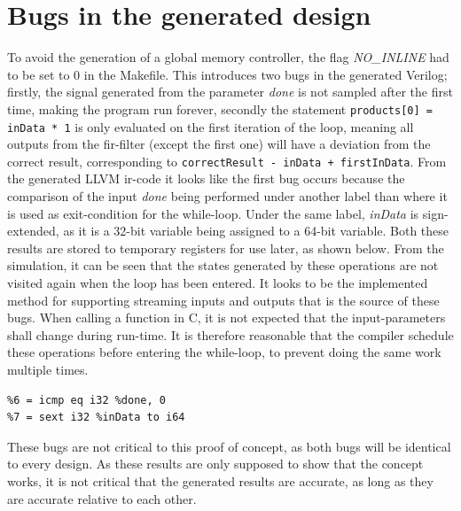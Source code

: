 \section{\label{sec:designbugs}Bugs in the generated design}
To avoid the generation of a global memory controller, the flag \textit{NO\_INLINE} had to be set to 0 in the Makefile. This introduces two bugs in the generated Verilog; firstly, the signal generated from the parameter \textit{done} is not sampled after the first time, making the program run forever, secondly the statement \verb!products[0] = inData * 1! is only evaluated on the first iteration of the loop, meaning all outputs from the \gls{fir}-filter (except the first one) will have a deviation from the correct result, corresponding to \verb!correctResult - inData + firstInData!. From the generated LLVM \gls{ir}-code it looks like the first bug occurs because the comparison of the input \textit{done} being performed under another label than where it is used as exit-condition for the while-loop. Under the same label, \textit{inData} is sign-extended, as it is a 32-bit variable being assigned to a 64-bit variable. Both these results are stored to temporary registers for use later, as shown below. From the simulation, it can be seen that the states generated by these operations are not visited again when the loop has been entered. It looks to be the implemented method for supporting streaming inputs and outputs that is the source of these bugs. When calling a function in C, it is not expected that the input-parameters shall change during run-time. It is therefore reasonable that the compiler schedule these operations before entering the while-loop, to prevent doing the same work multiple times.
\lstset{language=llvm,style=LLVMstyle}
\begin{lstlisting}
%6 = icmp eq i32 %done, 0
%7 = sext i32 %inData to i64
\end{lstlisting}
These bugs are not critical to this proof of concept, as both bugs will be identical to every design. As these results are only supposed to show that the concept works, it is not critical that the generated results are accurate, as long as they are accurate relative to each other.
